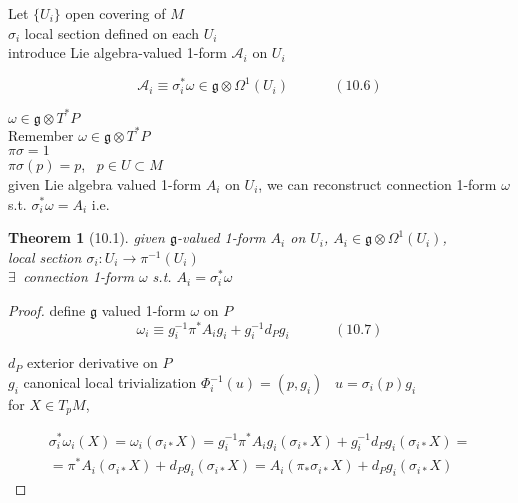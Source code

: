 \documentclass{book}
\newtheorem{theorem}{Theorem}
\begin{document}
Let $\lbrace U_i \rbrace$ open covering of $M$ \\
\phantom{ Let } $\sigma_i$ local section defined on each $U_i$   \\ 

introduce Lie algebra-valued 1-form $\mathcal{A}_i$ on $U_i$

\begin{equation}
  \mathcal{A}_i \equiv \sigma_i^* \omega \in \mathfrak{g} \otimes \Omega^1(U_i) \quad \quad \quad \, (10.6)
\end{equation}


$\omega \in \mathfrak{g} \otimes T^*P$ \\

Remember $\omega \in \mathfrak{g} \otimes T^*P$ \\
\phantom{Remember } $\pi \sigma = 1$ \\
\phantom{Remember } $\pi \sigma(p) = p$, \, $p \in U \subset M$ \\

given Lie algebra valued 1-form $A_i$ on $U_i$, we can reconstruct connection 1-form $\omega$ s.t. $\sigma_i^* \omega = A_i$ i.e.

\begin{theorem}[10.1]
  given $\mathfrak{g}$-valued 1-form $A_i$ on $U_i$, $A_i \in \mathfrak{g} \otimes \Omega^1(U_i)$, \\
\phantom{given} local section $\sigma_i:U_i \to \pi^{-1}(U_i)$ \\

$\exists \, $ connection 1-form $\omega$ s.t. $A_i = \sigma_i^* \omega$

\end{theorem}

\begin{proof}
define $\mathfrak{g}$ valued 1-form $\omega$ on $P$ 
\begin{equation}
  \omega_i \equiv g_i^{-1} \pi^* A_i g_i + g_i^{-1} d_P g_i \quad \quad \quad \, (10.7)
\end{equation}

$d_P$ exterior derivative on $P$ \\

$g_i$ canonical local trivialization $\Phi_i^{-1}(u) = (p,g_i)$ \quad \, $u = \sigma_i(p)g_i$ \\

for $X \in T_pM$, 

\[
\begin{gathered}
  \sigma_i^*\omega_i(X) = \omega_i(\sigma_{i*}X) = g_i^{-1} \pi^* A_i g_i(\sigma_{i*} X) + g_i^{-1} d_P g_i(\sigma_{i*}X) = \\
  = \pi^*A_i(\sigma_{i*} X) + d_Pg_i(\sigma_{i*}X) = A_i(\pi_* \sigma_{i*}X) + d_Pg_i(\sigma_{i*} X)
\end{gathered}
\]
\end{proof}
\end{document}
